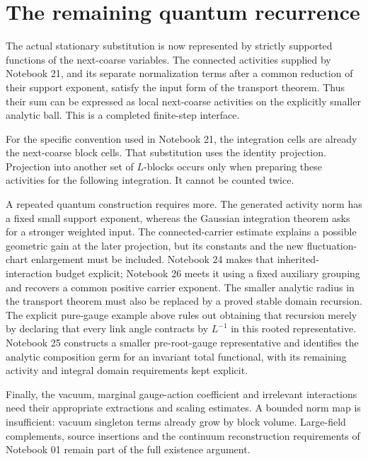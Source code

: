 \documentclass[11pt]{article}
\theoremstyle{remark}
\begin{document}
\section{The remaining quantum recurrence}
\label{ct22-next}

The actual stationary substitution is now represented by
strictly supported functions of the next-coarse variables.
The connected activities supplied by Notebook 21, and its
separate normalization terms after a common reduction of
their support exponent, satisfy the input form of the
transport theorem. Thus their sum can be expressed as
local next-coarse activities on the explicitly smaller
analytic ball. This is a completed finite-step interface.

For the specific convention used in Notebook 21, the
integration cells are already the next-coarse block cells.
That substitution uses the identity projection. Projection
into another set of $L$-blocks occurs only when preparing
these activities for the following integration. It cannot
be counted twice.

A repeated quantum construction requires more. The generated
activity norm has a fixed small support exponent, whereas the
Gaussian integration theorem asks for a stronger weighted
input. The connected-carrier estimate explains a possible
geometric gain at the later projection, but its constants
and the new fluctuation-chart enlargement must be included.
Notebook 24 makes that inherited-interaction budget explicit;
Notebook 26 meets it using a fixed auxiliary grouping and
recovers a common positive carrier exponent.
The smaller analytic radius in the transport theorem must
also be replaced by a proved stable domain recursion.
The explicit pure-gauge example above rules out obtaining
that recursion merely by declaring that every link angle
contracts by $L^{-1}$ in this rooted representative.
Notebook 25 constructs a smaller pre-root-gauge representative
and identifies the analytic composition germ for an invariant
total functional, with its remaining activity and integral
domain requirements kept explicit.

Finally, the vacuum, marginal gauge-action coefficient and
irrelevant interactions need their appropriate extractions
and scaling estimates. A bounded norm map is insufficient:
vacuum singleton terms already grow by block volume.
Large-field complements, source insertions and the continuum
reconstruction requirements of Notebook 01 remain part of
the full existence argument.
\end{document}
